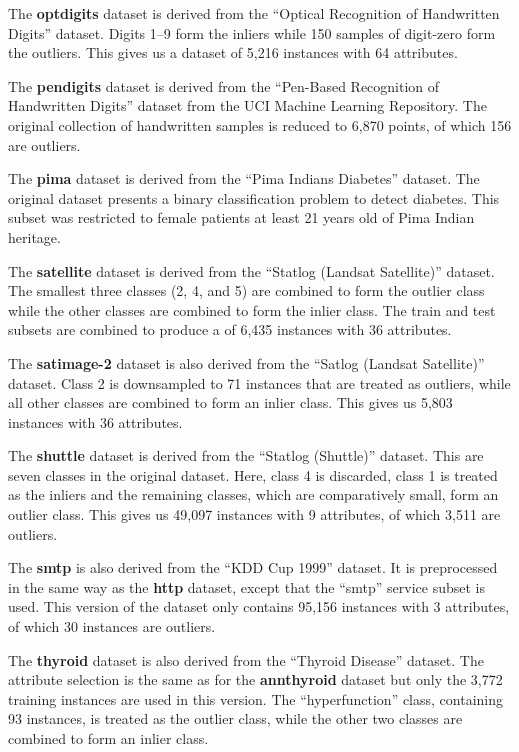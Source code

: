 The \textbf{optdigits} dataset is derived from the ``Optical Recognition of Handwritten Digits'' dataset.
Digits 1--9 form the inliers while 150 samples of digit-zero form the outliers.
This gives us a dataset of 5,216 instances with 64 attributes.

The \textbf{pendigits} dataset is derived from the ``Pen-Based Recognition of Handwritten Digits'' dataset from the UCI Machine Learning Repository.
The original collection of handwritten samples is reduced to 6,870 points, of which 156 are outliers.

The \textbf{pima} dataset is derived from the ``Pima Indians Diabetes'' dataset.
The original dataset presents a binary classification problem to detect diabetes.
This subset was restricted to female patients at least 21 years old of Pima Indian heritage.

The \textbf{satellite} dataset is derived from the ``Statlog (Landsat Satellite)'' dataset.
The smallest three classes (2, 4, and 5) are combined to form the outlier class while the other classes are combined to form the inlier class.
The train and test subsets are combined to produce a of 6,435 instances with 36 attributes.

The \textbf{satimage-2} dataset is also derived from the ``Satlog (Landsat Satellite)'' dataset.
Class 2 is downsampled to 71 instances that are treated as outliers, while all other classes are combined to form an inlier class.
This gives us 5,803 instances with 36 attributes.

The \textbf{shuttle} dataset is derived from the ``Statlog (Shuttle)'' dataset.
This are seven classes in the original dataset.
Here, class 4 is discarded, class 1 is treated as the inliers and the remaining classes, which are comparatively small, form an outlier class.
This gives us 49,097 instances with 9 attributes, of which 3,511 are outliers.

The \textbf{smtp} is also derived from the ``KDD Cup 1999'' dataset.
It is preprocessed in the same way as the \textbf{http} dataset, except that the ``smtp'' service subset is used.
This version of the dataset only contains 95,156 instances with 3 attributes, of which 30 instances are outliers.

The \textbf{thyroid} dataset is also derived from the ``Thyroid Disease'' dataset.
The attribute selection is the same as for the \textbf{annthyroid} dataset but only the 3,772 training instances are used in this version.
The ``hyperfunction'' class, containing 93 instances, is treated as the outlier class, while the other two classes are combined to form an inlier class.

